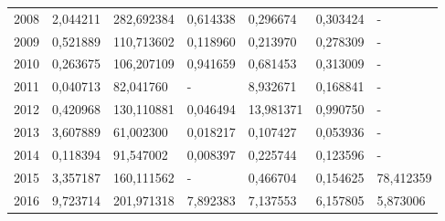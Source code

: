 \begin{table}
\begin{tabular}{p{1cm}p{2cm}p{2cm}p{2cm}p{2cm}p{2cm}p{2cm}}
 2008 &                                 2,044211 &                                   282,692384 &                  0,614338 &                                    0,296674 &                               0,303424 &                             - \\
 2009 &                                 0,521889 &                                   110,713602 &                  0,118960 &                                    0,213970 &                               0,278309 &                             - \\
 2010 &                                 0,263675 &                                   106,207109 &                  0,941659 &                                    0,681453 &                               0,313009 &                             - \\
 2011 &                                 0,040713 &                                    82,041760 &                         - &                                    8,932671 &                               0,168841 &                             - \\
 2012 &                                 0,420968 &                                   130,110881 &                  0,046494 &                                   13,981371 &                               0,990750 &                             - \\
 2013 &                                 3,607889 &                                    61,002300 &                  0,018217 &                                    0,107427 &                               0,053936 &                             - \\
 2014 &                                 0,118394 &                                    91,547002 &                  0,008397 &                                    0,225744 &                               0,123596 &                             - \\
 2015 &                                 3,357187 &                                   160,111562 &                         - &                                    0,466704 &                               0,154625 &                     78,412359 \\
 2016 &                                 9,723714 &                                   201,971318 &                  7,892383 &                                    7,137553 &                               6,157805 &                      5,873006 \\
\bottomrule
\end{tabular}
\end{table}
